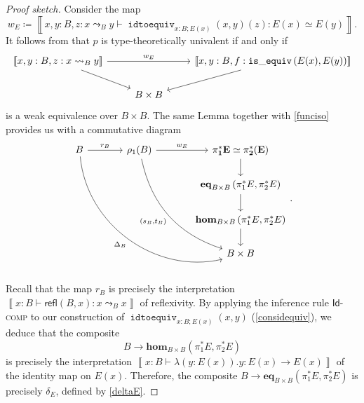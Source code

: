 \documentclass[10pt,letterpaper,cm]{nupset}
\theoremstyle{definition}
\theoremstyle{theorem}
\theoremstyle{remark}
\newcommand{\id}{\mathsf{Id}}
\newcommand{\refl}{\mathsf{refl}}
\newcommand{\0}{\mathbf{0}}
\newcommand{\1}{\mathbf{1}}
\newcommand{\2}{\mathbf{2}}
\DeclareMathOperator{\isequiv}{\mathtt{is\_equiv}}
\DeclareMathOperator{\equiveq}{\mathtt{idtoequiv}}
\begin{document}
\begin{proof}[Proof sketch]
Consider the map 
\[
w_E\coloneqq \left\llbracket{x,y:B, z: x\leadsto_B y \vdash  \equiveq_{{x:B}; E(x)}(x,y)(z) : E(x) \simeq E(y)}\right\rrbracket
.\] It follows from \cite[Lemma 3.3.2]{KL} that $p$ is type-theoretically univalent if and only if
\[
\begin{tikzcd}
{\left\llbracket{x,y:B, z: x\leadsto_B y}\right\rrbracket} \arrow[rd] \arrow[rr, "w_E"] &           & {\left\llbracket{x,y:B, f: \isequiv\left(E(x), E(y)\right)}\right\rrbracket} \arrow[ld] \\
                                                                                                                                                                                                                      & B\times B &                                                                                        
\end{tikzcd}
\]  is a weak equivalence over $B\times B$. The same Lemma together with \cref{funciso} provides us with a commutative diagram
\[
\begin{tikzcd}[column sep=large]
B \arrow[r, "r_B"] \arrow[rrddd, "\Delta_B"', bend right=49] & \rho_1(B) \arrow[rddd, "{\left(s_B, t_B\right)}"', bend right] \arrow[r, "w_E"] & \mathbf{\pi_1^{\ast}{E}\simeq \pi_2^{\ast}(E)} \arrow[d]                          \\
                                                             &                                                                                 & {\mathbf{eq}_{B\times B}\left(\pi_1^{\ast}{E}, \pi_2^{\ast}{E}\right)} \arrow[d]  \\
                                                             &                                                                                 & {\mathbf{hom}_{B\times B}\left(\pi_1^{\ast}{E}, \pi_2^{\ast}{E}\right)} \arrow[d] \\
                                                             &                                                                                 & B\times B                                                                        
\end{tikzcd}.
\]
Recall that the map $r_B$ is precisely the interpretation $\left\llbracket{x:B \vdash \refl(B,x) : x\leadsto_B x}\right\rrbracket$ of reflexivity. By applying the inference rule $\id$-\textsc{comp}  to our construction of $\equiveq_{{x:B}; E(x)}(x,y)$  (\cref{considequiv}), we deduce that the composite
\[
B\longrightarrow \mathbf{hom}_{B\times B}\left(\pi_1^{\ast}{E}, \pi_2^{\ast}{E}\right) 
\] is precisely the interpretation $\left\llbracket{  x: B\vdash  \lambda(y:E(x) ).y: E(x) \to E(x) }\right\rrbracket$ of the identity map on $E(x)$. Therefore, the composite $B\longrightarrow \mathbf{eq}_{B\times B}\left(\pi_1^{\ast}{E}, \pi_2^{\ast}{E}\right) $  is precisely $\delta_E$, defined by \eqref{deltaE}. 


\end{proof}
\end{document}
